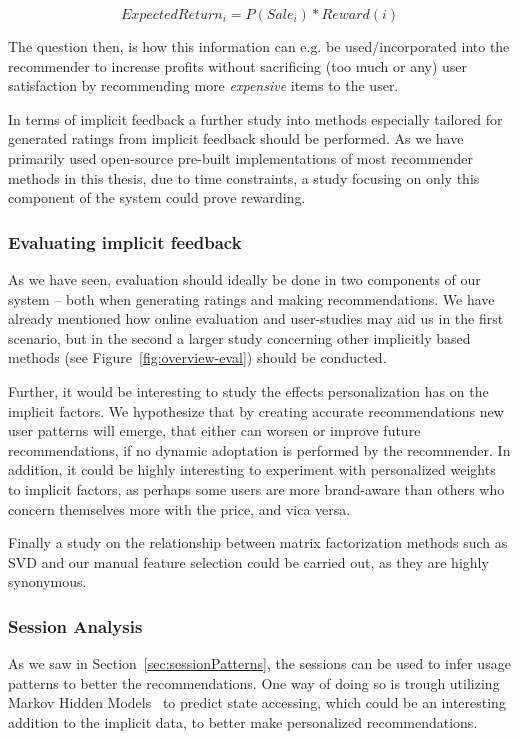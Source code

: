 \begin{equation}
ExpectedReturn_i = P(Sale_i) * Reward(i)
\end{equation}

The question then, is how this information can e.g. be used/incorporated into
the recommender to increase profits without sacrificing (too much or any) user
satisfaction by recommending more \emph{expensive} items to the user.

In terms of implicit feedback a further study into methods especially tailored
for generated ratings from implicit feedback should be performed. As we have
primarily used open-source pre-built implementations of most recommender
methods in this thesis, due to time constraints, a study focusing on only this
component of the system could prove rewarding.

\subsubsection{Evaluating implicit feedback}

As we have seen, evaluation should ideally be done in two components of our
system -- both when generating ratings and making recommendations. We have
already mentioned how online evaluation and user-studies may aid us in the
first scenario, but in the second a larger study concerning other implicitly
based methods (see Figure~\ref{fig:overview-eval}) should be conducted.

Further, it would be interesting to study the effects personalization has on
the implicit factors. We hypothesize that by creating accurate recommendations
new user patterns will emerge, that either can worsen or improve future
recommendations, if no dynamic adoptation is performed by the recommender. In
addition, it could be highly interesting to experiment with personalized
weights to implicit factors, as perhaps some users are more brand-aware than
others who concern themselves more with the price, and vica versa.

Finally a study on the relationship between matrix factorization methods such
as SVD and our manual feature selection could be carried out, as they are
highly synonymous.

\subsubsection{Session Analysis}

As we saw in Section~\ref{sec:sessionPatterns}, the sessions can be used to infer usage patterns to better the recommendations. One way of doing so is trough utilizing Markov Hidden Models~\cite{rabiner1986introduction} to predict state accessing, which could be an interesting addition to the implicit data, to better make personalized recommendations.


